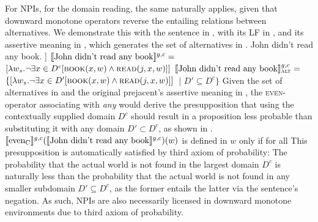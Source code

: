For NPIs, for the domain reading, the same naturally applies, given that downward monotone operators reverse the entailing relations between alternatives. We demonstrate this with the sentence in , with its LF in , and its assertive meaning in , which generates the set of alternatives in .
\pex[nopreamble=true]%
\a{} John didn't read any book.
\a[]\phantomsection [even\textsubscript{C} [not [John read any book]]
\a{} $\intension[g,c]{John didn't read any book}=$\\\emptyfill$[\lambda{w_s}.\neg\exists{x\in D^c}[\predicate{book}(x,w)\land\predicate{read}(j,x,w)]]$
\a{} $\intension[g,c]{John didn't read any book}_{\text{\scshape alt}}=$\\\emptyfill$\{[\lambda{w_s}.\neg\exists{x\in D'}[\predicate{book}(x,w)\land\predicate{read}(j,x,w)]]$~| $D'\subseteq D^c\}$
\xe
Given the set of alternatives in  and the original prejacent's assertive meaning in , the {\scshape even}-operator associating with \textit{any} would derive the presupposition that using the contextually supplied domain $D^c$ should result in a proposition less probable than substituting it with any domain $D'\subset D^c$, as shown in .
\ex{}
$\intension[g,c]{even\textsubscript{C}}(\intension[g,c]{John didn't read any book})(w)$ is defined in $w$ only if for all\linebreak{}
\xe
This presupposition is automatically satisfied by  third axiom of probability: The probability that the actual world is not found in the largest domain $D^c$ is naturally less than the probability that the actual world is not found in any smaller subdomain $D'\subseteq D^c$, as the former entails the latter via the sentence's negation. As such, NPIs are also necessarily licensed in downward monotone environments due to  third axiom of probability.

